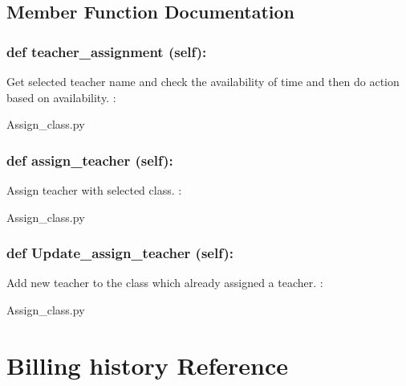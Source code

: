 \subsection{Member Function Documentation}
\hypertarget{class_poly_a14a7ad77ce612b0c54f531d307ee4b39}{
\subsubsection[{def teacher_assignment (self):}]{\setlength{\rightskip}{0pt plus 5cm}def {teacher\_assignment} (self):}}\label{class_poly_a14a7ad77ce612b0c54f531d307ee4b39}
Get selected teacher name and check the availability of time and then do action based on availability.
:\begin{DoxyCompactItemize}
\item 
Assign\_class.\-py\end{DoxyCompactItemize}

\hypertarget{class_poly_a14a7ad77ce612b0c54f531d307ee4b39}{
\subsubsection[{def assign_teacher (self):}]{\setlength{\rightskip}{0pt plus 5cm}def {assign\_teacher} (self):}}\label{class_poly_a14a7ad77ce612b0c54f531d307ee4b39}
Assign teacher with selected class.
:\begin{DoxyCompactItemize}
\item 
Assign\_class.\-py\end{DoxyCompactItemize}

\hypertarget{class_poly_a14a7ad77ce612b0c54f531d307ee4b39}{
\subsubsection[{def Update_assign_teacher (self):}]{\setlength{\rightskip}{0pt plus 5cm}def {Update\_assign\_teacher} (self):}}\label{class_poly_a14a7ad77ce612b0c54f531d307ee4b39}
Add new teacher to the class which already assigned a teacher.
:\begin{DoxyCompactItemize}
\item 
Assign\_class.\-py\end{DoxyCompactItemize}


\hypertarget{Billing_history}{\section{Billing history Reference}
\label{Billing_history}
}

